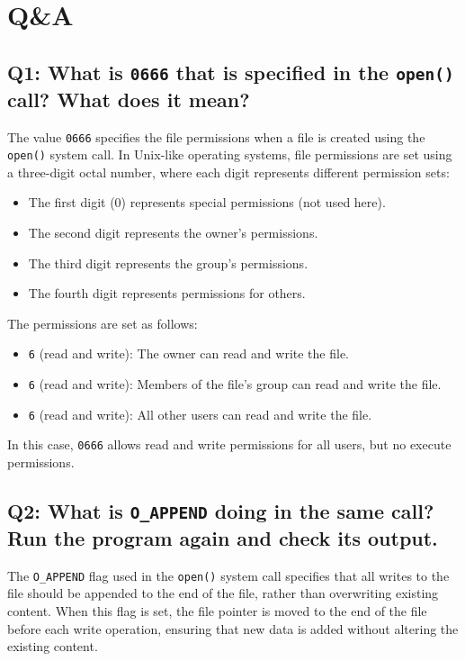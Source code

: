 \documentclass{article}
\begin{document}
\section{Q\&A}

\subsection*{Q1: What is \texttt{0666} that is specified in the \texttt{open()} call? What does it mean?}

The value \texttt{0666} specifies the file permissions when a file is created using the \texttt{open()} system call. In Unix-like operating systems, file permissions are set using a three-digit octal number, where each digit represents different permission sets:

\begin{itemize}
    \item The first digit (0) represents special permissions (not used here).
    \item The second digit represents the owner's permissions.
    \item The third digit represents the group's permissions.
    \item The fourth digit represents permissions for others.
\end{itemize}

The permissions are set as follows:
\begin{itemize}
    \item \texttt{6} (read and write): The owner can read and write the file.
    \item \texttt{6} (read and write): Members of the file's group can read and write the file.
    \item \texttt{6} (read and write): All other users can read and write the file.
\end{itemize}

In this case, \texttt{0666} allows read and write permissions for all users, but no execute permissions.

\subsection*{Q2: What is \texttt{O\_APPEND} doing in the same call? Run the program again and check its output.}

The \texttt{O\_APPEND} flag used in the \texttt{open()} system call specifies that all writes to the file should be appended to the end of the file, rather than overwriting existing content. When this flag is set, the file pointer is moved to the end of the file before each write operation, ensuring that new data is added without altering the existing content.
\end{document}
